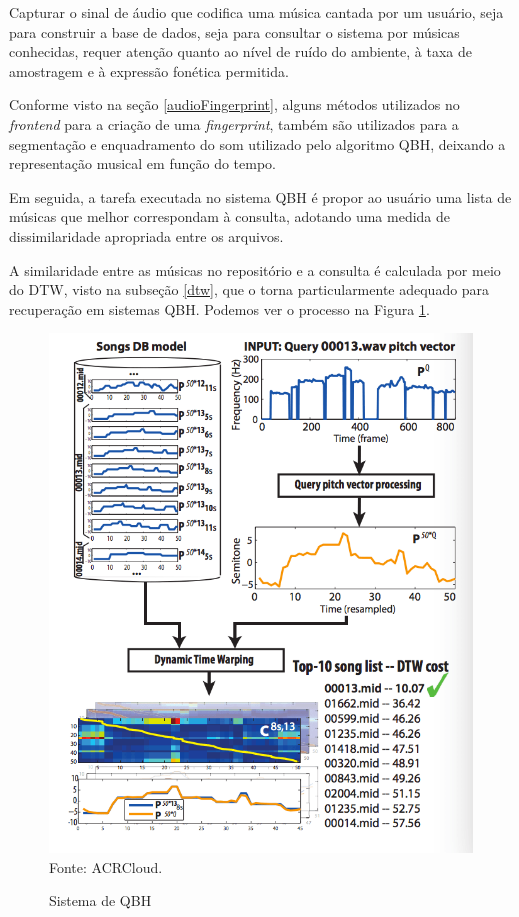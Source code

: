 Capturar o sinal de áudio que codifica uma música cantada por um usuário, seja para construir a base de dados, seja para consultar o sistema por músicas conhecidas, requer atenção quanto ao nível de ruído do ambiente, à taxa de amostragem e à expressão fonética permitida. 

Conforme visto na seção \ref{audioFingerprint}, alguns métodos utilizados no \textit{frontend} para a criação de uma \textit{fingerprint}, também são utilizados para a segmentação e enquadramento do som utilizado pelo algoritmo QBH, deixando a representação musical em função do tempo.

Em seguida, a tarefa executada no sistema QBH é propor ao usuário uma lista de músicas que melhor correspondam à consulta, adotando uma medida de dissimilaridade apropriada entre os arquivos.

A similaridade entre as músicas no repositório e a consulta é calculada por meio do DTW, visto na subseção \ref{dtw}, que o torna particularmente adequado para recuperação em sistemas QBH. Podemos ver o processo na Figura \ref{fig:qbhProcesso}.

\begin{figure}[!htb]
   \centering
   \caption{Sistema de QBH}\label{fig:qbhProcesso} 
   \includegraphics[scale=0.95]{figuras/query_by_humming.png}
   \\Fonte: ACRCloud.
\end{figure}

